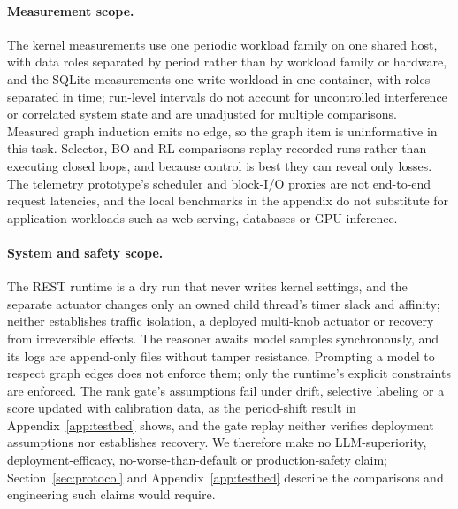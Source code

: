\paragraph{Measurement scope.}
The kernel measurements use one periodic workload family on one shared host, with data roles separated by period rather than by workload family or hardware, and the SQLite measurements one write workload in one container, with roles separated in time; run-level intervals do not account for uncontrolled interference or correlated system state and are unadjusted for multiple comparisons. Measured graph induction emits no edge, so the graph item is uninformative in this task. Selector, BO and RL comparisons replay recorded runs rather than executing closed loops, and because control is best they can reveal only losses. The telemetry prototype's scheduler and block-I/O proxies are not end-to-end request latencies, and the local benchmarks in the appendix do not substitute for application workloads such as web serving, databases or GPU inference.

\paragraph{System and safety scope.}
The REST runtime is a dry run that never writes kernel settings, and the separate actuator changes only an owned child thread's timer slack and affinity; neither establishes traffic isolation, a deployed multi-knob actuator or recovery from irreversible effects. The reasoner awaits model samples synchronously, and its logs are append-only files without tamper resistance. Prompting a model to respect graph edges does not enforce them; only the runtime's explicit constraints are enforced. The rank gate's assumptions fail under drift, selective labeling or a score updated with calibration data, as the period-shift result in Appendix~\ref{app:testbed} shows, and the gate replay neither verifies deployment assumptions nor establishes recovery. We therefore make no LLM-superiority, deployment-efficacy, no-worse-than-default or production-safety claim; Section~\ref{sec:protocol} and Appendix~\ref{app:testbed} describe the comparisons and engineering such claims would require.
